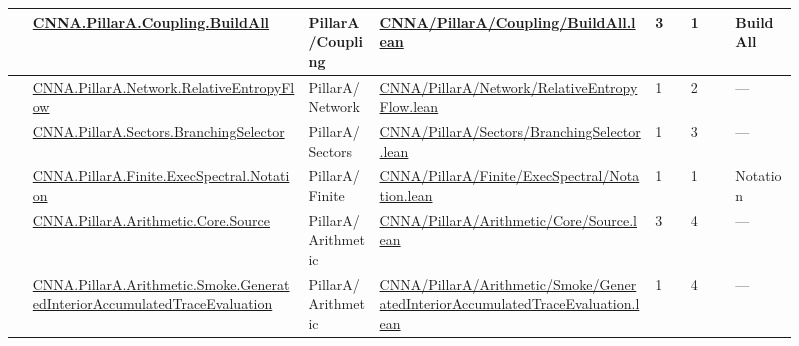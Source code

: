 \begin{longtable}{L{0.025\linewidth} L{0.315\linewidth} L{0.08\linewidth} L{0.315\linewidth} L{0.045\linewidth} L{0.055\linewidth} L{0.07\linewidth}}
\hline
{} & \href{run:repo_snapshot/CNNA/PillarA/Coupling/BuildAll.lean}{CNNA.\allowbreak{}PillarA.\allowbreak{}Coupling.\allowbreak{}BuildAll} & PillarA/\allowbreak{}Coupling & \href{run:repo_snapshot/CNNA/PillarA/Coupling/BuildAll.lean}{CNNA/\allowbreak{}PillarA/\allowbreak{}Coupling/\allowbreak{}BuildAll.\allowbreak{}lean} & 3 & 1 & BuildAll\\
\hline
{} & \href{run:repo_snapshot/CNNA/PillarA/Network/RelativeEntropyFlow.lean}{CNNA.\allowbreak{}PillarA.\allowbreak{}Network.\allowbreak{}RelativeEntropyFlow} & PillarA/\allowbreak{}Network & \href{run:repo_snapshot/CNNA/PillarA/Network/RelativeEntropyFlow.lean}{CNNA/\allowbreak{}PillarA/\allowbreak{}Network/\allowbreak{}RelativeEntropyFlow.\allowbreak{}lean} & 1 & 2 & ---\\
\hline
{} & \href{run:repo_snapshot/CNNA/PillarA/Sectors/BranchingSelector.lean}{CNNA.\allowbreak{}PillarA.\allowbreak{}Sectors.\allowbreak{}BranchingSelector} & PillarA/\allowbreak{}Sectors & \href{run:repo_snapshot/CNNA/PillarA/Sectors/BranchingSelector.lean}{CNNA/\allowbreak{}PillarA/\allowbreak{}Sectors/\allowbreak{}BranchingSelector.\allowbreak{}lean} & 1 & 3 & ---\\
\hline
{} & \href{run:repo_snapshot/CNNA/PillarA/Finite/ExecSpectral/Notation.lean}{CNNA.\allowbreak{}PillarA.\allowbreak{}Finite.\allowbreak{}ExecSpectral.\allowbreak{}Notation} & PillarA/\allowbreak{}Finite & \href{run:repo_snapshot/CNNA/PillarA/Finite/ExecSpectral/Notation.lean}{CNNA/\allowbreak{}PillarA/\allowbreak{}Finite/\allowbreak{}ExecSpectral/\allowbreak{}Notation.\allowbreak{}lean} & 1 & 1 & Notation\\
\hline
{} & \href{run:repo_snapshot/CNNA/PillarA/Arithmetic/Core/Source.lean}{CNNA.\allowbreak{}PillarA.\allowbreak{}Arithmetic.\allowbreak{}Core.\allowbreak{}Source} & PillarA/\allowbreak{}Arithmetic & \href{run:repo_snapshot/CNNA/PillarA/Arithmetic/Core/Source.lean}{CNNA/\allowbreak{}PillarA/\allowbreak{}Arithmetic/\allowbreak{}Core/\allowbreak{}Source.\allowbreak{}lean} & 3 & 4 & ---\\
\hline
{} & \href{run:repo_snapshot/CNNA/PillarA/Arithmetic/Smoke/GeneratedInteriorAccumulatedTraceEvaluation.lean}{CNNA.\allowbreak{}PillarA.\allowbreak{}Arithmetic.\allowbreak{}Smoke.\allowbreak{}GeneratedInteriorAccumulatedTraceEvaluation} & PillarA/\allowbreak{}Arithmetic & \href{run:repo_snapshot/CNNA/PillarA/Arithmetic/Smoke/GeneratedInteriorAccumulatedTraceEvaluation.lean}{CNNA/\allowbreak{}PillarA/\allowbreak{}Arithmetic/\allowbreak{}Smoke/\allowbreak{}GeneratedInteriorAccumulatedTraceEvaluation.\allowbreak{}lean} & 1 & 4 & ---\\

\end{longtable}
